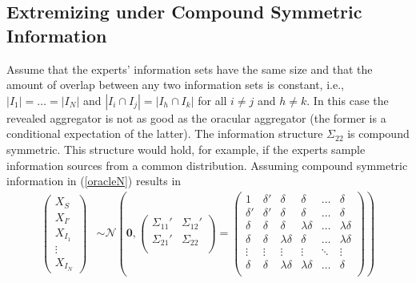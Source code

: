 \documentclass[11pt]{article}
\theoremstyle{definition}
\theoremstyle{definition}
\def\probit{p_{\rm probit}}
\begin{document}
\subsection{Extremizing under Compound Symmetric Information}
\label{compound}

Assume that the experts' information sets have the 
same size and that the amount of overlap between any two information 
sets is constant, i.e., $|I_{1}| =  \dots = |I_{N}|$ and 
$|I_{i} \cap I_{j}| = |I_{h} \cap I_{k}|$ for all $i \neq j$ 
and $h \neq k$.  In this case the revealed aggregator is not
as good as the oracular aggregator (the former is a conditional
expectation of the latter).  
The information structure $\Sigma_{22}$ is compound symmetric.  
This structure would hold, for example, if the experts 
sample information sources from a common distribution. 
Assuming compound symmetric information in (\ref{oracleN}) results in
\begin{align}
\label{eq:symmetric}
\left(\begin{matrix} X_{S} \\ X_{I'}\\ X_{I_1}\\ \vdots \\ X_{I_N} 
   \end{matrix}\right) 
  &\sim \mathcal{N}\left( \boldsymbol{0}, \left(\begin{matrix} 
\Sigma_{11}' & \Sigma_{12}'\\
\Sigma_{21}' & \Sigma_{22}\\
 \end{matrix}\right) 
 =
 \left(\begin{array}{cc|cccc}
1 & \delta'& \delta & \delta & \dots & \delta  \\ 
\delta' & \delta' & \delta & \delta & \dots & \delta  \\ \hline
\delta & \delta &\delta & \lambda\delta & \dots & \lambda\delta   \\ 
\delta& \delta & \lambda\delta & \delta & \dots & \lambda\delta  \\ 
\vdots &\vdots & \vdots & \vdots & \ddots & \vdots  \\ 
\delta &\delta & \lambda\delta & \lambda\delta & \dots & \delta\\ 
 \end{array}\right)\right)
\end{align}
\end{document}
